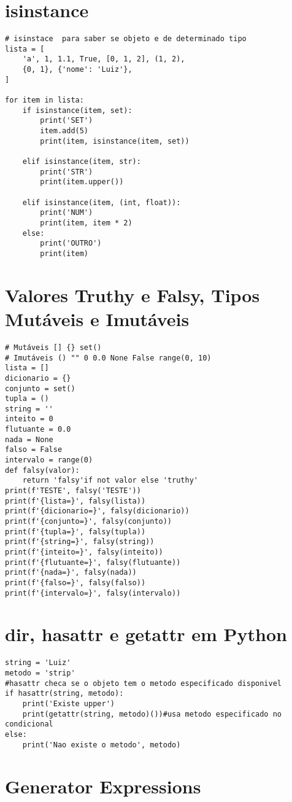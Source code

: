 \documentclass{article}
\begin{document}
\section{isinstance}
\begin{lstlisting}
# isinstace  para saber se objeto e de determinado tipo
lista = [
    'a', 1, 1.1, True, [0, 1, 2], (1, 2),
    {0, 1}, {'nome': 'Luiz'},
]

for item in lista:
    if isinstance(item, set):
        print('SET')
        item.add(5)
        print(item, isinstance(item, set))

    elif isinstance(item, str):
        print('STR')
        print(item.upper())

    elif isinstance(item, (int, float)):
        print('NUM')
        print(item, item * 2)
    else:
        print('OUTRO')
        print(item)
\end{lstlisting}
\section{Valores Truthy e Falsy, Tipos Mutáveis e Imutáveis}
\begin{lstlisting}
# Mutáveis [] {} set()
# Imutáveis () "" 0 0.0 None False range(0, 10)
lista = []
dicionario = {}
conjunto = set()
tupla = ()
string = ''
inteito = 0
flutuante = 0.0
nada = None
falso = False
intervalo = range(0)
def falsy(valor):
    return 'falsy'if not valor else 'truthy'
print(f'TESTE', falsy('TESTE'))
print(f'{lista=}', falsy(lista))
print(f'{dicionario=}', falsy(dicionario))
print(f'{conjunto=}', falsy(conjunto))
print(f'{tupla=}', falsy(tupla))
print(f'{string=}', falsy(string))
print(f'{inteito=}', falsy(inteito))
print(f'{flutuante=}', falsy(flutuante))
print(f'{nada=}', falsy(nada))
print(f'{falso=}', falsy(falso))
print(f'{intervalo=}', falsy(intervalo))
\end{lstlisting}
\section{dir, hasattr e getattr em Python}
\begin{lstlisting}
string = 'Luiz'
metodo = 'strip'
#hasattr checa se o objeto tem o metodo especificado disponivel
if hasattr(string, metodo):
    print('Existe upper')
    print(getattr(string, metodo)())#usa metodo especificado no condicional
else:
    print('Nao existe o metodo', metodo)
\end{lstlisting}
\section{Generator Expressions}
\end{document}
